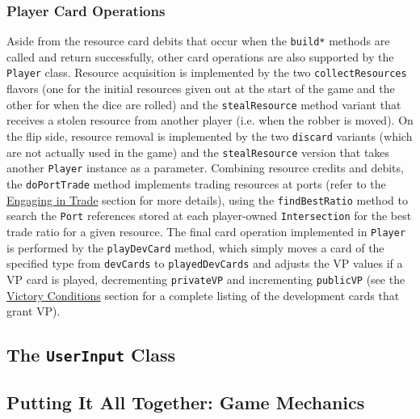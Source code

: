 \documentclass[pageno]{jpaper}
\begin{document}
\begin{doublespacing}
\hypertarget{sec:player_card_operations}{}
\subsubsection{Player Card Operations}

Aside from the resource card debits that occur when the \lstinline$build*$ methods are called and return successfully, other card operations are also supported by the \lstinline$Player$ class. Resource acquisition is implemented by the two \lstinline$collectResources$ flavors (one for the initial resources given out at the start of the game and the other for when the dice are rolled) and the \lstinline$stealResource$ method variant that receives a stolen resource from another player (i.e. when the robber is moved). On the flip side, resource removal is implemented by the two \lstinline$discard$ variants (which are not actually used in the game) and the \lstinline$stealResource$ version that takes another \lstinline$Player$ instance as a parameter. Combining resource credits and debits, the \lstinline$doPortTrade$ method implements trading resources at ports (refer to the \hyperlink{sec:engaging_in_trade}{Engaging in Trade} section for more details), using the \lstinline$findBestRatio$ method to search the \lstinline$Port$ references stored at each player-owned \lstinline$Intersection$ for the best trade ratio for a given resource. The final card operation implemented in \lstinline$Player$ is performed by the \lstinline$playDevCard$ method, which simply moves a card of the specified type from \lstinline$devCards$ to \lstinline$playedDevCards$ and adjusts the VP values if a VP card is played, decrementing \lstinline$privateVP$ and incrementing \lstinline$publicVP$ (see the \hyperlink{sec:victory_conditions}{Victory Conditions} section for a complete listing of the development cards that grant VP).

\hypertarget{sec:the_userinput_class}{}
\subsection{The \lstinline$UserInput$ Class}

\hypertarget{sec:putting_it_all_together_game_mechanics}{}
\subsection{Putting It All Together: Game Mechanics}



\hypertarget{sec:challenges_encountered}{}

\end{doublespacing}
\end{document}

